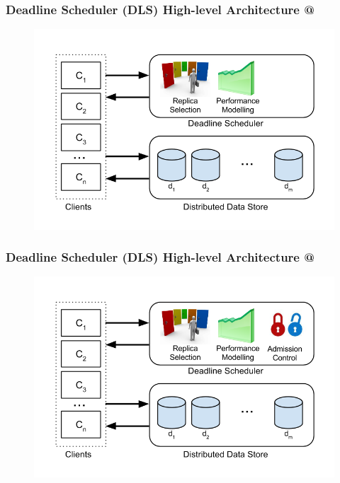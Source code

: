 \documentclass{beamer}
\makeatletter
\newcommand*{\rom}[1]{\expandafter\@slowromancap\romannumeral #1@}
\makeatother
\begin{document}
\begin{frame}
  \frametitle{Deadline Scheduler (DLS) High-level Architecture \rom{3}}
  \begin{figure}
    \begin{center}
      \centerline{\includegraphics[scale=0.44]{img/DLS_ARCH_3.png}}
    \end{center}
  \end{figure}
\end{frame}
\begin{frame}
  \frametitle{Deadline Scheduler (DLS) High-level Architecture \rom{4}}
  \begin{figure}
    \begin{center}
      \centerline{\includegraphics[scale=0.44]{img/DLS_ARCH_4.png}}
    \end{center}
  \end{figure}
\end{frame}
\end{document}
